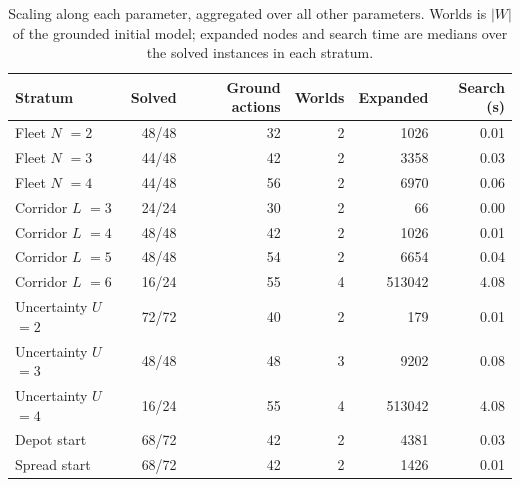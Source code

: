 \begin{table}[H]
\centering
\small
\caption{Scaling along each parameter, aggregated over all other parameters.
Worlds is $|W|$ of the grounded initial model; expanded nodes and search time
are medians over the solved instances in each stratum.}
\label{tab:scaling}
\begin{tabular}{@{}l r r r r r@{}}
\toprule
\textbf{Stratum} & \textbf{Solved} & \textbf{Ground actions} & \textbf{Worlds}
 & \textbf{Expanded} & \textbf{Search (s)} \\
\midrule
Fleet $N$ $= 2$ & 48/48 & 32 & 2 & 1026 & 0.01 \\
Fleet $N$ $= 3$ & 44/48 & 42 & 2 & 3358 & 0.03 \\
Fleet $N$ $= 4$ & 44/48 & 56 & 2 & 6970 & 0.06 \\
\addlinespace
Corridor $L$ $= 3$ & 24/24 & 30 & 2 & 66 & 0.00 \\
Corridor $L$ $= 4$ & 48/48 & 42 & 2 & 1026 & 0.01 \\
Corridor $L$ $= 5$ & 48/48 & 54 & 2 & 6654 & 0.04 \\
Corridor $L$ $= 6$ & 16/24 & 55 & 4 & 513042 & 4.08 \\
\addlinespace
Uncertainty $U$ $= 2$ & 72/72 & 40 & 2 & 179 & 0.01 \\
Uncertainty $U$ $= 3$ & 48/48 & 48 & 3 & 9202 & 0.08 \\
Uncertainty $U$ $= 4$ & 16/24 & 55 & 4 & 513042 & 4.08 \\
\addlinespace
Depot start & 68/72 & 42 & 2 & 4381 & 0.03 \\
Spread start & 68/72 & 42 & 2 & 1426 & 0.01 \\
\bottomrule
\end{tabular}
\end{table}
